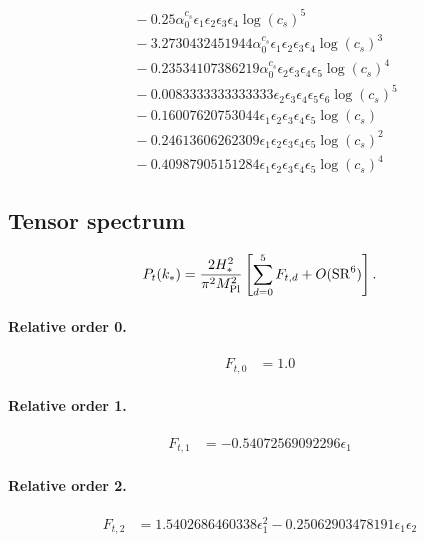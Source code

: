 \documentclass[10pt]{article}
\begin{document}
\begin{align*}
&{}  - 0.25 \alpha_{0}^{c_s} \epsilon_{1} \epsilon_{2} \epsilon_{3} \epsilon_{4} \log{\left(c_{s} \right)}^{5} \\
&{}  - 3.2730432451944 \alpha_{0}^{c_s} \epsilon_{1} \epsilon_{2} \epsilon_{3} \epsilon_{4} \log{\left(c_{s} \right)}^{3} \\
&{}  - 0.23534107386219 \alpha_{0}^{c_s} \epsilon_{2} \epsilon_{3} \epsilon_{4} \epsilon_{5} \log{\left(c_{s} \right)}^{4} \\
&{}  - 0.0083333333333333 \epsilon_{2} \epsilon_{3} \epsilon_{4} \epsilon_{5} \epsilon_{6} \log{\left(c_{s} \right)}^{5} \\
&{}  - 0.16007620753044 \epsilon_{1} \epsilon_{2} \epsilon_{3} \epsilon_{4} \epsilon_{5} \log{\left(c_{s} \right)} \\
&{}  - 0.24613606262309 \epsilon_{1} \epsilon_{2} \epsilon_{3} \epsilon_{4} \epsilon_{5} \log{\left(c_{s} \right)}^{2} \\
&{}  - 0.40987905151284 \epsilon_{1} \epsilon_{2} \epsilon_{3} \epsilon_{4} \epsilon_{5} \log{\left(c_{s} \right)}^{4}
\end{align*}

\subsection{Tensor spectrum}
\[P_t(k_*)=\frac{2H_*^2}{\pi^2M_{\rm Pl}^2}\left[\sum_{d=0}^{5}F_{t,d}+O(\mathrm{SR}^{6})\right].\]
\paragraph{Relative order 0.}
\begin{align*}
F_{t,0} &= 1.0
\end{align*}

\paragraph{Relative order 1.}
\begin{align*}
F_{t,1} &=  - 0.54072569092296 \epsilon_{1}
\end{align*}

\paragraph{Relative order 2.}
\begin{align*}
F_{t,2} &= 1.5402686460338 \epsilon_{1}^{2} - 0.25062903478191 \epsilon_{1} \epsilon_{2}
\end{align*}
\end{document}
